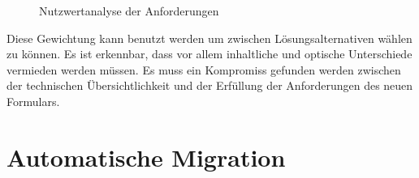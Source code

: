 \begin{figure}[ht]
	\centering
	\caption{Nutzwertanalyse der Anforderungen}
	\label{figNutz}
\end{figure}

Diese Gewichtung kann benutzt werden um zwischen Lösungsalternativen wählen zu können. Es ist erkennbar, dass vor allem inhaltliche und optische Unterschiede vermieden werden müssen. Es muss ein Kompromiss gefunden werden zwischen der technischen Übersichtlichkeit und der Erfüllung der Anforderungen des neuen Formulars.


\section{Automatische Migration}
\label{ch:Migration}

